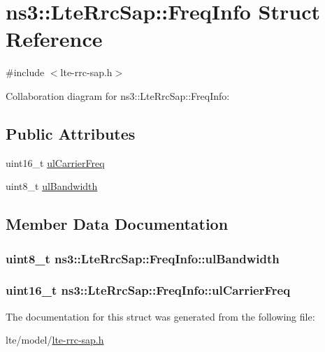 \hypertarget{structns3_1_1LteRrcSap_1_1FreqInfo}{}\section{ns3\+:\+:Lte\+Rrc\+Sap\+:\+:Freq\+Info Struct Reference}
\label{structns3_1_1LteRrcSap_1_1FreqInfo}


{\ttfamily \#include $<$lte-\/rrc-\/sap.\+h$>$}



Collaboration diagram for ns3\+:\+:Lte\+Rrc\+Sap\+:\+:Freq\+Info\+:
\subsection*{Public Attributes}
\begin{DoxyCompactItemize}
\item 
uint16\+\_\+t \hyperlink{structns3_1_1LteRrcSap_1_1FreqInfo_a7daca860e6236cf07b976c042a2a62f4}{ul\+Carrier\+Freq}
\item 
uint8\+\_\+t \hyperlink{structns3_1_1LteRrcSap_1_1FreqInfo_a1dcd6380a8b6e3b8600b0937ae85c682}{ul\+Bandwidth}
\end{DoxyCompactItemize}


\subsection{Member Data Documentation}
\subsubsection[{\texorpdfstring{ul\+Bandwidth}{ulBandwidth}}]{\setlength{\rightskip}{0pt plus 5cm}uint8\+\_\+t ns3\+::\+Lte\+Rrc\+Sap\+::\+Freq\+Info\+::ul\+Bandwidth}\hypertarget{structns3_1_1LteRrcSap_1_1FreqInfo_a1dcd6380a8b6e3b8600b0937ae85c682}{}\label{structns3_1_1LteRrcSap_1_1FreqInfo_a1dcd6380a8b6e3b8600b0937ae85c682}
\subsubsection[{\texorpdfstring{ul\+Carrier\+Freq}{ulCarrierFreq}}]{\setlength{\rightskip}{0pt plus 5cm}uint16\+\_\+t ns3\+::\+Lte\+Rrc\+Sap\+::\+Freq\+Info\+::ul\+Carrier\+Freq}\hypertarget{structns3_1_1LteRrcSap_1_1FreqInfo_a7daca860e6236cf07b976c042a2a62f4}{}\label{structns3_1_1LteRrcSap_1_1FreqInfo_a7daca860e6236cf07b976c042a2a62f4}


The documentation for this struct was generated from the following file\+:\begin{DoxyCompactItemize}
\item 
lte/model/\hyperlink{lte-rrc-sap_8h}{lte-\/rrc-\/sap.\+h}\end{DoxyCompactItemize}

